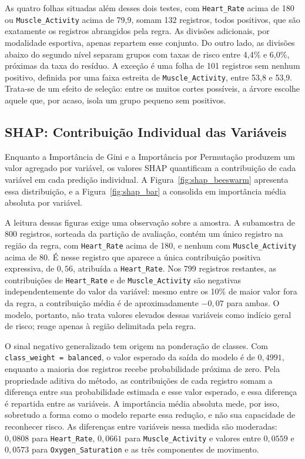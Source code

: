 As quatro folhas situadas além desses dois testes, com \texttt{Heart\_Rate} acima de 180 ou \texttt{Muscle\_Activity} acima de 79{,}9, somam 132 registros, todos positivos, que são exatamente os registros abrangidos pela regra. As divisões adicionais, por modalidade esportiva, apenas repartem esse conjunto. Do outro lado, as divisões abaixo do segundo nível separam grupos com taxas de risco entre 4{,}4\% e 6{,}0\%, próximas da taxa do resíduo. A exceção é uma folha de 101 registros sem nenhum positivo, definida por uma faixa estreita de \texttt{Muscle\_Activity}, entre 53{,}8 e 53{,}9. Trata-se de um efeito de seleção: entre os muitos cortes possíveis, a árvore escolhe aquele que, por acaso, isola um grupo pequeno sem positivos.

\subsection{SHAP: Contribuição Individual das Variáveis}
\label{sec:shap}

Enquanto a Importância de Gini e a Importância por Permutação produzem um valor agregado por variável, os valores SHAP quantificam a contribuição de cada variável em cada predição individual. A Figura~\ref{fig:shap_beeswarm} apresenta essa distribuição, e a Figura~\ref{fig:shap_bar} a consolida em importância média absoluta por variável.

A leitura dessas figuras exige uma observação sobre a amostra. A subamostra de 800 registros, sorteada da partição de avaliação, contém um único registro na região da regra, com \texttt{Heart\_Rate} acima de 180, e nenhum com \texttt{Muscle\_Activity} acima de 80. É nesse registro que aparece a única contribuição positiva expressiva, de $0{,}56$, atribuída a \texttt{Heart\_Rate}. Nos 799 registros restantes, as contribuições de \texttt{Heart\_Rate} e de \texttt{Muscle\_Activity} são negativas independentemente do valor da variável: mesmo entre os 10\% de maior valor fora da regra, a contribuição média é de aproximadamente $-0{,}07$ para ambas. O modelo, portanto, não trata valores elevados dessas variáveis como indício geral de risco; reage apenas à região delimitada pela regra.

O sinal negativo generalizado tem origem na ponderação de classes. Com \texttt{class\_weight = balanced}, o valor esperado da saída do modelo é de $0{,}4991$, enquanto a maioria dos registros recebe probabilidade próxima de zero. Pela propriedade aditiva do método, as contribuições de cada registro somam a diferença entre sua probabilidade estimada e esse valor esperado, e essa diferença é repartida entre as variáveis. A importância média absoluta mede, por isso, sobretudo a forma como o modelo reparte essa redução, e não sua capacidade de reconhecer risco. As diferenças entre variáveis nessa medida são moderadas: $0{,}0808$ para \texttt{Heart\_Rate}, $0{,}0661$ para \texttt{Muscle\_Activity} e valores entre $0{,}0559$ e $0{,}0573$ para \texttt{Oxygen\_Saturation} e as três componentes de movimento.

